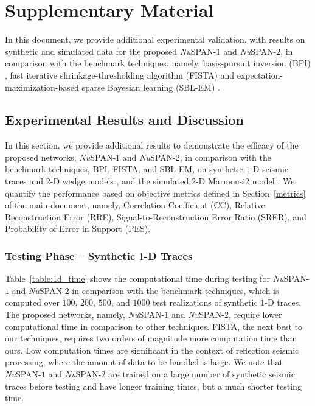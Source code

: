 \documentclass[journal]{IEEEtran}
\begin{document}



\clearpage
\newpage

\appendices

\section*{Supplementary Material}
In this document, we provide additional experimental validation, with results on synthetic and simulated data for the proposed {\it Nu}SPAN-$1$ and {\it Nu}SPAN-$2$, in comparison with the benchmark techniques, namely, basis-pursuit inversion (BPI) \cite{chen2001atomic, zhang2011seismic}, fast iterative shrinkage-thresholding algorithm (FISTA) \cite{beck2009fast, perez2012inversion} and expectation-maximization-based sparse Bayesian learning (SBL-EM) \cite{wipf2004sparse, yuan2019seismic}.

\subsection{Experimental Results and Discussion}
In this section, we provide additional results to demonstrate the efficacy of the proposed networks, {\it Nu}SPAN-$1$ and {\it Nu}SPAN-$2$, in comparison with the benchmark techniques, BPI, FISTA, and SBL-EM, on synthetic $1$-D seismic traces and $2$-D wedge models \cite{hamlyn2014thin}, and the simulated $2$-D Marmousi$2$ model \cite{martin2006marmousi2}. We quantify the performance based on objective metrics defined in Section~\ref{metrics} of the main document, namely, Correlation Coefficient (CC), Relative Reconstruction Error (RRE), Signal-to-Reconstruction Error Ratio (SRER), and Probability of Error in Support (PES).

\subsubsection{Testing Phase -- Synthetic \texorpdfstring{$1$}{1}-D Traces}

Table~\ref{table:1d_time} shows the computational time during testing for {\it Nu}SPAN-$1$ and {\it Nu}SPAN-$2$ in comparison with the benchmark techniques, which is computed over $100$, $200$, $500$, and $1000$ test realizations of synthetic $1$-D traces. The proposed networks, namely, {\it Nu}SPAN-$1$ and {\it Nu}SPAN-$2$, require lower computational time in comparison to other techniques. FISTA, the next best to our techniques, requires two orders of magnitude more computation time than ours. Low computation times are significant in the context of reflection seismic processing, where the amount of data to be handled is large. We note that {\it Nu}SPAN-$1$ and {\it Nu}SPAN-$2$ are trained on a large number of synthetic seismic traces before testing and have longer training times, but a much shorter testing time. 
\end{document}
